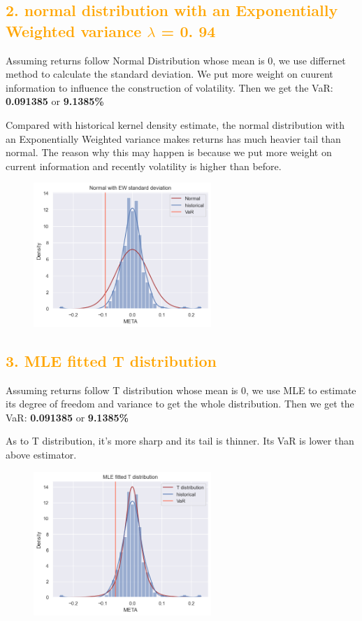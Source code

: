 \documentclass[11pt,en]{elegantpaper}
\begin{document}
\subsection*{\textcolor{orange}{2. normal distribution with an Exponentially Weighted variance $\lambda$ = 0. 94}}

Assuming returns follow Normal Distribution whose mean is 0, we use differnet method to calculate the standard deviation. We put more weight on cuurent information to influence the construction of volatility. Then we get the VaR: \textbf{0.091385} or \textbf{9.1385\%} 

Compared with historical kernel density estimate, the normal distribution with an Exponentially Weighted variance makes returns has much heavier tail than normal. The reason why this may happen is because we put more weight on current information and recently volatility is higher than before.

\begin{figure}[htbp] 
    \centering 
    \includegraphics[width=0.6\textwidth]{./image/EWMA.png} 
\end{figure}

\subsection*{\textcolor{orange}{3. MLE fitted T distribution}}

Assuming returns follow T distribution whose mean is 0, we use MLE to estimate its degree of freedom and variance to get the whole distribution.  Then we get the VaR: \textbf{0.091385} or \textbf{9.1385\%} 

As to T distribution, it's more sharp and its tail is thinner. Its VaR is lower than above estimator.
\begin{figure}[htbp] 
    \centering 
    \includegraphics[width=0.6\textwidth]{./image/T.png} 
\end{figure}
\end{document}
